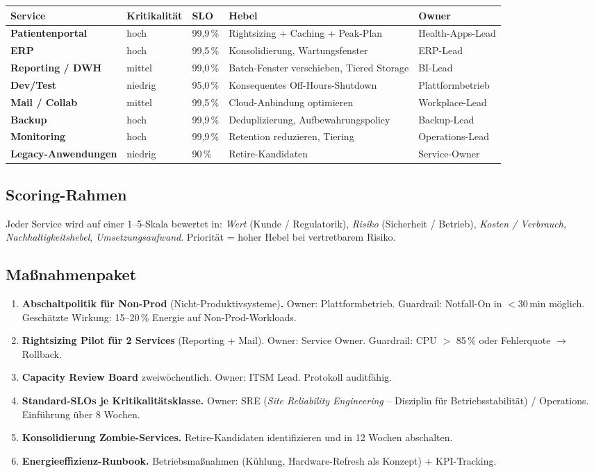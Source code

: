 \documentclass[11pt,a4paper,oneside]{article}
\begin{document}
\begin{tabularx}{\linewidth}{@{}>{\bfseries}lXXXX@{}}
\toprule
Service & Kritikalität & SLO & Hebel & Owner \\
\midrule
Patientenportal & hoch & 99,9\,\% & Rightsizing + Caching + Peak-Plan & Health-Apps-Lead \\
ERP & hoch & 99,5\,\% & Konsolidierung, Wartungsfenster & ERP-Lead \\
Reporting / DWH & mittel & 99,0\,\% & Batch-Fenster verschieben, Tiered Storage & BI-Lead \\
Dev/Test & niedrig & 95,0\,\% & Konsequentes Off-Hours-Shutdown & Plattformbetrieb \\
Mail / Collab & mittel & 99,5\,\% & Cloud-Anbindung optimieren & Workplace-Lead \\
Backup & hoch & 99,9\,\% & Deduplizierung, Aufbewahrungspolicy & Backup-Lead \\
Monitoring & hoch & 99,9\,\% & Retention reduzieren, Tiering & Operations-Lead \\
Legacy-Anwendungen & niedrig & 90\,\% & Retire-Kandidaten & Service-Owner \\
\bottomrule
\end{tabularx}

\subsection{Scoring-Rahmen}

Jeder Service wird auf einer 1--5-Skala bewertet in: \emph{Wert} (Kunde / Regulatorik), \emph{Risiko} (Sicherheit / Betrieb), \emph{Kosten / Verbrauch}, \emph{Nachhaltigkeitshebel}, \emph{Umsetzungsaufwand}. Priorität = hoher Hebel bei vertretbarem Risiko.

\subsection{Maßnahmenpaket}

\begin{enumerate}
  \item \textbf{Abschaltpolitik für Non-Prod} (Nicht-Produktivsysteme)\textbf{.} Owner: Plattformbetrieb. Guardrail: Notfall-On in $<$30\,min möglich. Geschätzte Wirkung: 15--20\,\% Energie auf Non-Prod-Workloads.
  \item \textbf{Rightsizing Pilot für 2 Services} (Reporting + Mail). Owner: Service Owner. Guardrail: CPU $>$ 85\,\% oder Fehlerquote $\to$ Rollback.
  \item \textbf{Capacity Review Board} zweiwöchentlich. Owner: ITSM Lead. Protokoll auditfähig.
  \item \textbf{Standard-SLOs je Kritikalitätsklasse.} Owner: SRE (\emph{Site Reliability Engineering} -- Disziplin für Betriebsstabilität) / Operations. Einführung über 8 Wochen.
  \item \textbf{Konsolidierung Zombie-Services.} Retire-Kandidaten identifizieren und in 12 Wochen abschalten.
  \item \textbf{Energieeffizienz-Runbook.} Betriebsmaßnahmen (Kühlung, Hardware-Refresh als Konzept) + KPI-Tracking.
\end{enumerate}
\end{document}
